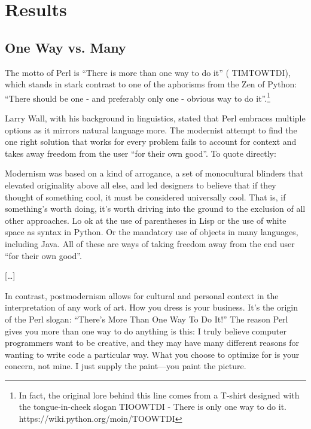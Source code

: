\section{Results}
\label{sec:5}

\subsection{One Way vs. Many}
\label{sec:5.1}

The motto of Perl is “There is more than one way to do it” ( TIMTOWTDI), which stands in stark contrast to one of the aphorisms
from the Zen of Python: “There should be one - and preferably only one - obvious way to do it”.\footnote[1]{ In fact, the original
lore behind this line comes from a T-shirt designed with the tongue-in-cheek slogan TIOOWTDI -
There is only one way to do it. https://wiki.python.org/moin/TOOWTDI}

Larry Wall, with his background in linguistics, stated that Perl embraces multiple options as it mirrors natural language more.
The modernist attempt to find the one right solution that works for every problem fails to account for context and takes
away freedom from the user “for their own good”. To quote directly:

\begin{displayquote}
    Modernism was based on a kind of arrogance, a set of monocultural blinders that elevated originality above all else,
    and led designers to believe that if they thought of something cool, it must be considered universally cool.
    That is, if something's worth doing, it's worth driving into the ground to the exclusion of all other approaches. Lo
    ok at the use of parentheses in Lisp or the use of white space as syntax in Python. Or the mandatory use of objects
    in many languages, including Java. All of these are ways of taking freedom away from the end user “for their own good”.

    [\ldots]

    In contrast, postmodernism allows for cultural and personal context in the interpretation of any work of art.
    How you dress is your business. It's the origin of the Perl slogan: “There's More Than One Way To Do It!”
    The reason Perl gives you more than one way to do anything is this: I truly believe computer programmers want to be
    creative, and they may have many different reasons for wanting to write code a particular way. What you choose to
    optimize for is your concern, not mine. I just supply the paint—you paint the picture. \cite{guru_perl}
\end{displayquote}

